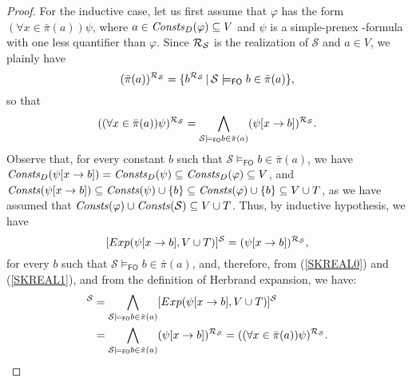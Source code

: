 \documentclass[manyauthors]{fundam}
\newcommand{\HExp}{Exp}
\newcommand{\nonpairssym}{\bar{\pi}}
\newcommand{\nonpairs}[1]{\nonpairssym(#1)}
\newcommand{\atset}{\mathcal{S}}
\newcommand{\DomConsts}{\Consts_D}
\newcommand{\consta}{a}
\newcommand{\constb}{b}
\newcommand{\subst}[3]{#1[#2\rightarrow#3]}
\newcommand{\fomodels}[2]{#1 \models_{\mathsf{FO}} #2}
\begin{document}
\begin{proof}
For the inductive case, let us first assume that $\varphi$ has the 
form $(\forall x \in \nonpairs{\consta})\psi$, where $a \in 
\DomConsts(\varphi) \subseteq V$ and $\psi$ is a simple-prenex 
\Forallpizero-formula with one less quantifier than $\varphi$.
%
Since $\Realization_{\!\atset}$ is the realization of $\atset$ and $a 
\in V$, we plainly have
\begin{equation}\label{SKREAL0}
(\nonpairs{\consta})^{\Realization_{\!\atset}} = \{ 
\constb^{\Realization_{\!\atset}} \,|\,
\fomodels{\atset}{\constb \in \nonpairs{\consta}} \},
\end{equation}
so that
\begin{equation}\label{SKREAL1}
((\forall x \in \nonpairs{\consta})\psi)^{\Realization_{\!\atset}} = 
\bigwedge\limits_{\fomodels{\atset}{\constb \in \nonpairs{\consta}}} 
(\subst{\psi}{x}{\constb})^{\Realization_{\!\atset}}.
\end{equation}
%
Observe that, for every constant $\constb$ such that
$\fomodels{\atset}{\constb \in \nonpairs{\consta}}$, we have
$\DomConsts(\subst{\psi}{x}{\constb}) = \DomConsts(\psi) \subseteq
\DomConsts(\varphi) \subseteq V$, and
$\Consts(\subst{\psi}{x}{\constb}) \subseteq \Consts(\psi) \cup \{\constb\}
\subseteq \Consts(\varphi) \cup \{\constb\} \subseteq V \cup T$, as
we have assumed that $\Consts(\varphi) \cup \Consts(\atset) \subseteq 
V \cup T$.
Thus, by inductive hypothesis, we have
\[
   [\HExp(\subst{\psi}{x}{\constb}, V \cup T)]^{\atset} = 
(\subst{\psi}{x}{\constb})^{\Realization_{\!\atset}} ,
\]
for every $\constb$ such that $\fomodels{\atset}{\constb \in 
\nonpairs{\consta}}$, and, therefore, from (\ref{SKREAL0}) and 
(\ref{SKREAL1}), and from the definition of Herbrand expansion, we 
have:
\begin{align*}
  [\HExp((\forall x \in \nonpairs{\consta})\psi, V \cup T)]^{\atset} &=
  \bigwedge\limits_{\fomodels{\atset}{\constb \in 
\nonpairs{\consta}}}[\HExp(\subst{\psi}{x}{\constb}, V \cup 
T)]^{\atset}  \\
&=  \bigwedge\limits_{\fomodels{\atset}{\constb \in 
\nonpairs{\consta}}} 
(\subst{\psi}{x}{\constb})^{\Realization_{\!\atset}} =
   ((\forall x \in \nonpairs{\consta})\psi)^{\Realization_{\!\atset}} .
\end{align*}


\end{proof}
\end{document}
